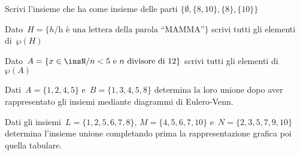 \begin{esercizio}
 \label{ese:7.4}
 Scrivi l'insieme che ha come insieme delle parti
$\{\emptyset,\{8,10\},\{8\},\{10\}\}$
\end{esercizio}

\begin{esercizio}
 \label{ese:7.5}
Dato~$H=\{h/\text{h è una lettera della parola ``MAMMA''}\}$ scrivi
tutti gli elementi di~$\wp (H)$
\end{esercizio}

\begin{esercizio}
 \label{ese:7.6}
 Dato~$A=\{x\in\insN/ n<5\text{ e }n\text{ divisore di~12}\}$ scrivi tutti gli 
elementi di
$\wp (A)$
\end{esercizio}


\begin{esercizio}
 \label{ese:7.7}
Dati~$A=\{1,2,4,5\}$ e~$B=\{1,3,4,5,8\}$ determina la loro unione dopo
aver rappresentato gli insiemi mediante diagrammi di Eulero-Venn.
 \end{esercizio}

\begin{esercizio}
 \label{ese:7.8}
 Dati gli insiemi~$L=\{1,2,5,6,7,8\}$, $M=\{4,5,6,7,10\}$ e~$N=\{2,3,5,7,9,10\}$
determina l'insieme unione completando prima la rappresentazione
grafica poi quella tabulare.
\begin{center}
 
\end{center}
\end{esercizio}

